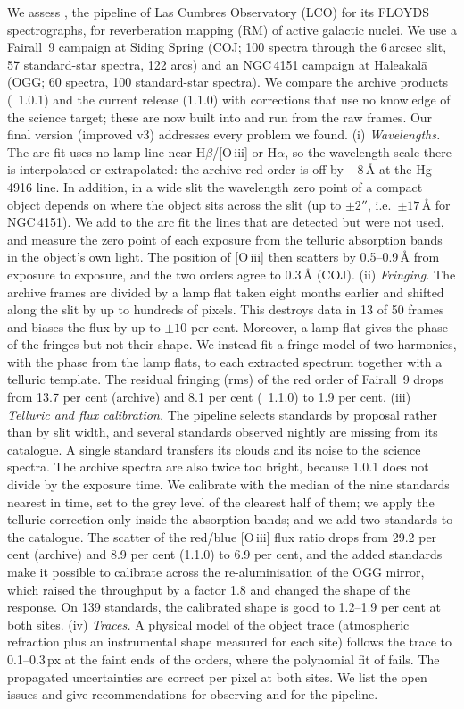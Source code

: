 We assess \banzai{}, the pipeline of Las Cumbres Observatory (LCO) for its FLOYDS spectrographs, for reverberation
mapping (RM) of active galactic nuclei. We use a Fairall~9 campaign at Siding Spring (COJ; 100 spectra through the
6\,arcsec slit, 57 standard-star spectra, 122 arcs) and an NGC\,4151 campaign at Haleakal\=a (OGG; 60 spectra, 100
standard-star spectra). We compare the archive products (\banzai{}~1.0.1) and the current release (1.1.0) with
corrections that use no knowledge of the science target; these are now built into \banzai{} and run from the raw
frames. Our final version (improved v3) addresses every problem we found.
(i) \textit{Wavelengths.} The arc fit uses no lamp line near H$\beta$/[O\,{\sc iii}] or H$\alpha$, so the wavelength
scale there is interpolated or extrapolated: the archive red order is off by $-8$\,\AA{} at the Hg\,4916 line. In
addition, in a wide slit the wavelength zero point of a compact object depends on where the object sits across the
slit (up to $\pm2''$, i.e.\ $\pm17$\,\AA{} for NGC\,4151). We add to the arc fit the lines that are detected but were
not used, and measure the zero point of each exposure from the telluric absorption bands in the object's own light.
The position of [O\,{\sc iii}] then scatters by 0.5--0.9\,\AA{} from exposure to exposure, and the two orders agree to
0.3\,\AA{} (COJ).
(ii) \textit{Fringing.} The archive frames are divided by a lamp flat taken eight months earlier and shifted along the
slit by up to hundreds of pixels. This destroys data in 13 of 50 frames and biases the flux by up to $\pm10$ per cent.
Moreover, a lamp flat gives the phase of the fringes but not their shape. We instead fit a fringe model of two
harmonics, with the phase from the lamp flats, to each extracted spectrum together with a telluric template. The
residual fringing (rms) of the red order of Fairall~9 drops from 13.7 per cent (archive) and 8.1 per cent
(\banzai{}~1.1.0) to 1.9 per cent.
(iii) \textit{Telluric and flux calibration.} The pipeline selects standards by proposal rather than by slit width,
and several standards observed nightly are missing from its catalogue. A single standard transfers its clouds and its
noise to the science spectra. The archive spectra are also twice too bright, because 1.0.1 does not divide by the
exposure time. We calibrate with the median of the nine standards nearest in time, set to the grey level of the
clearest half of them; we apply the telluric correction only inside the absorption bands; and we add two standards to
the catalogue. The scatter of the red/blue [O\,{\sc iii}] flux ratio drops from 29.2 per cent (archive) and 8.9 per
cent (1.1.0) to 6.9 per cent, and the added standards make it possible to calibrate across the re-aluminisation of the
OGG mirror, which raised the throughput by a factor 1.8 and changed the shape of the response. On 139 standards, the
calibrated shape is good to 1.2--1.9 per cent at both sites.
(iv) \textit{Traces.} A physical model of the object trace (atmospheric refraction plus an instrumental shape measured
for each site) follows the trace to 0.1--0.3\,px at the faint ends of the orders, where the polynomial fit of
\banzai{} fails. The propagated uncertainties are correct per pixel at both sites. We list the open issues and give
recommendations for observing and for the pipeline.
